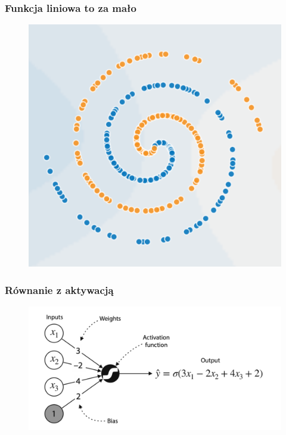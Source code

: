 \documentclass[smaller]{beamer}
\begin{document}

\begin{frame}
\frametitle{Funkcja liniowa to za mało}
\begin{figure}
    \centering
    \includegraphics[width=\textwidth,height=0.7\textheight,keepaspectratio]{../manifest/non-linear-data.png}
\end{figure}
\end{frame}


\begin{frame}
\frametitle{Równanie z aktywacją}
\begin{figure}
    \centering
    \includegraphics[width=\textwidth,height=0.7\textheight,keepaspectratio]{../manifest/activation.png}
\end{figure}
\end{frame}
\end{document}
